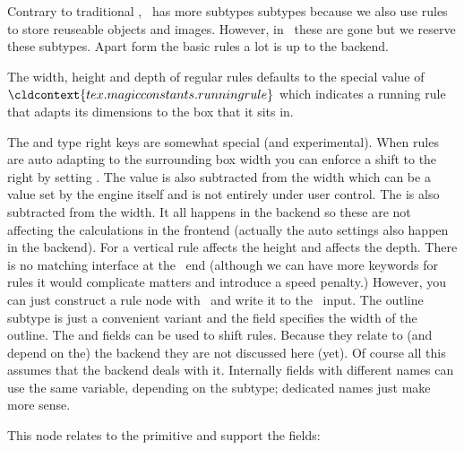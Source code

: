 
\stopsubsection

\startsubsection[title={rule}]

Contrary to traditional \TEX, \LUATEX\ has more subtypes subtypes because we also
use rules to store reuseable objects and images. However, in \LUAMETATEX\ these
are gone but we reserve these subtypes. Apart form the basic rules a lot is up to
the backend.


The width, height and depth of regular rules defaults to the special value of
$\cldcontext {tex . magicconstants . runningrule}$ which indicates a running rule
that adapts its dimensions to the box that it sits in.

The  and type {right} keys are somewhat special (and experimental).
When rules are auto adapting to the surrounding box width you can enforce a shift
to the right by setting . The value is also subtracted from the width
which can be a value set by the engine itself and is not entirely under user
control. The  is also subtracted from the width. It all happens in
the backend so these are not affecting the calculations in the frontend (actually
the auto settings also happen in the backend). For a vertical rule 
affects the height and  affects the depth. There is no matching
interface at the \TEX\ end (although we can have more keywords for rules it would
complicate matters and introduce a speed penalty.) However, you can just
construct a rule node with \LUA\ and write it to the \TEX\ input. The \type
{outline} subtype is just a convenient variant and the  field
specifies the width of the outline. The  and 
fields can be used to shift rules. Because they relate to (and depend on the) the
backend they are not discussed here (yet). Of course all this assumes that the
backend deals with it. Internally fields with different names can use the same
variable, depending on the subtype; dedicated names just make more sense.


\stopsubsection

\startsubsection[title={insert}]

This node relates to the \type {\insert} primitive and support the fields:


